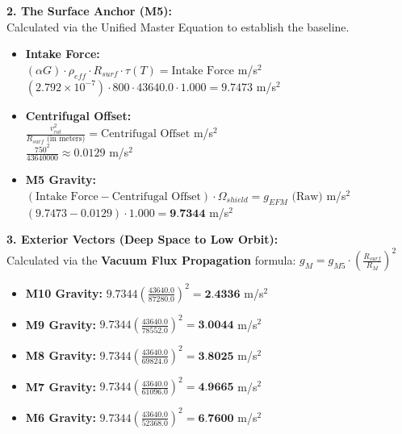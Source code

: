 \documentclass[11pt, a4paper]{article}
\begin{document}
  \vspace{1.0em}
  \noindent \textbf{2. The Surface Anchor (M5):} \\
  \hspace*{1em} Calculated via the Unified Master Equation to establish the baseline.
  \begin{itemize}
    \item \textbf{Intake Force:} \\[0.5em]
    \hspace*{2em} $(\alpha G) \cdot \rho_{eff} \cdot R_{surf} \cdot \tau(T) = \text{Intake Force}$ m/s$^2$ \\[1em]
    \hspace*{2em} $(2.792 \times 10^{-7}) \cdot 800 \cdot 43640.0 \cdot 1.000 = 9.7473$ m/s$^2$
    
    \item \textbf{Centrifugal Offset:} \\[0.5em]
    \hspace*{2em} $\frac{v_{rot}^2}{R_{surf} \text{ (in meters)}} = \text{Centrifugal Offset}$ m/s$^2$ \\[1em]
    \hspace*{2em} $\frac{750^2}{43640000} \approx 0.0129$ m/s$^2$
    
    \item \textbf{M5 Gravity:} \\[0.5em]
    \hspace*{2em} $(\text{Intake Force} - \text{Centrifugal Offset}) \cdot \Omega_{shield} = g_{EFM} \text{ (Raw)}$ m/s$^2$ \\[1em]
    \hspace*{2em} $(9.7473 - 0.0129) \cdot 1.000 = \textbf{9.7344}$ m/s$^2$
  \end{itemize}

  \clearpage
  \noindent \textbf{3. Exterior Vectors (Deep Space to Low Orbit):} \\
  \hspace*{1em} Calculated via the \textbf{Vacuum Flux Propagation} formula: $g_M = g_{M5} \cdot \left( \frac{R_{surf}}{R_M} \right)^2$
  \begin{itemize}
    \item \textbf{M10 Gravity:} $9.7344 \left( \frac{43640.0}{87280.0} \right)^2 = \textbf{2.4336}$ m/s$^2$
    \item \textbf{M9 Gravity:} $9.7344 \left( \frac{43640.0}{78552.0} \right)^2 = \textbf{3.0044}$ m/s$^2$
    \item \textbf{M8 Gravity:} $9.7344 \left( \frac{43640.0}{69824.0} \right)^2 = \textbf{3.8025}$ m/s$^2$
    \item \textbf{M7 Gravity:} $9.7344 \left( \frac{43640.0}{61096.0} \right)^2 = \textbf{4.9665}$ m/s$^2$
    \item \textbf{M6 Gravity:} $9.7344 \left( \frac{43640.0}{52368.0} \right)^2 = \textbf{6.7600}$ m/s$^2$
  \end{itemize}
\end{document}
